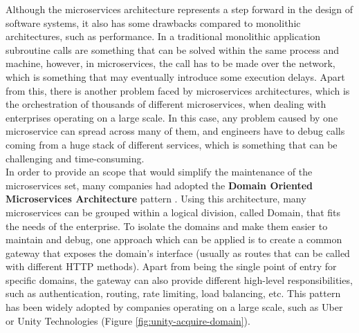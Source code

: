 \documentclass[english, 12pt, a4paper, sci, utf8, a-1b, online]{aaltothesis}
\begin{document}
Although the microservices architecture represents a step forward in the design of software systems, it also has some drawbacks compared to monolithic architectures, such as performance. In a traditional monolithic application subroutine calls are something that can be solved within the same process and machine, however, in microservices, the call has to be made over the network, which is something that may eventually introduce some execution delays. Apart from this, there is another problem faced by microservices architectures, which is the orchestration of thousands of different microservices, when dealing with enterprises operating on a large scale. In this case, any problem caused by one microservice can spread across many of them, and engineers have to debug calls coming from a huge stack of different services, which is something that can be challenging and time-consuming.\\

In order to provide an scope that would simplify the maintenance of the microservices set, many companies had adopted the \textbf{Domain Oriented Microservices Architecture} pattern \cite{DOMAUber}. Using this architecture, many microservices can be grouped within a logical division, called Domain, that fits the needs of the enterprise. To isolate the domains and make them easier to maintain and debug, one approach which can be applied is to create a common gateway that exposes the domain's interface (usually as routes that can be called with different HTTP methods). Apart from being the single point of entry for specific domains, the gateway can also provide different high-level responsibilities, such as authentication, routing, rate limiting, load balancing, etc. This pattern has been widely adopted by companies operating on a large scale, such as Uber \cite{GatewayUber} or Unity Technologies (Figure \ref{fig:unity-acquire-domain}).\\
\end{document}
